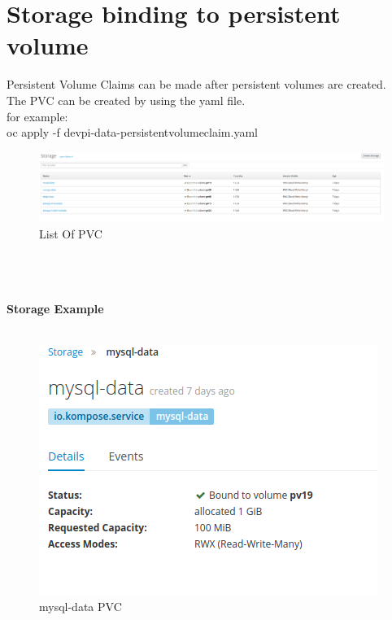 \documentclass[11pt]{report}
\begin{document}
	\pagebreak
	\section{Storage binding to persistent volume}
	Persistent Volume Claims can be made after persistent volumes are created. \ \\
	The PVC can be created by using the yaml file. \ \\
	for example: \ \\
	oc apply -f devpi-data-persistentvolumeclaim.yaml \ \\
		\begin{figure}[h!]
    	\begin{center}
    	   		\includegraphics[scale=.55]{storagelist.png}
    		\caption{List Of PVC}
    	  \end{center}
	  
	\end{figure}
	\ \\
	\ \\
	\ \\
	\large
	\textbf{Storage Example}
	\ \\
	\ \\
		\begin{figure}[h!]
    	\begin{center}
    	   		\includegraphics[scale=1]{storagexample.png}
    		\caption{mysql-data PVC}
    	  \end{center}
	  
	\end{figure}
	\pagebreak
	\large
\end{document}
